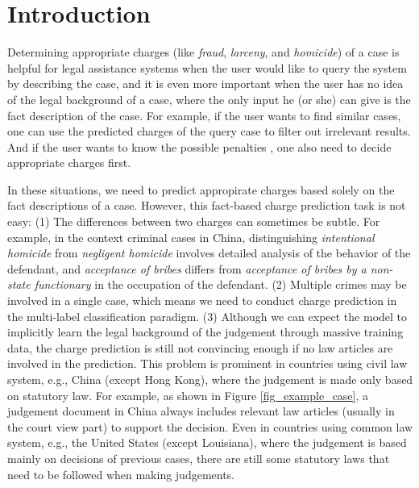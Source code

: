 \section{Introduction}
Determining appropriate charges (like \emph{fraud}, \emph{larceny}, and \emph{homicide}) of a case is helpful for legal assistance systems when the user would like to query the system by describing the case, and it is even more important when the user has no idea of the legal background of a case, where the only input he (or she) can give is the fact description of the case. 
For example, if the user wants to find similar cases, one can use the predicted charges of the query case to filter out irrelevant results. And if the user wants to know the possible penalties , one also need to decide appropriate charges first.


In these situations, we need to predict appropirate charges based solely on the fact descriptions of a case. 
However, this fact-based charge prediction task is not easy:
(1) The differences between two charges can sometimes be subtle. For example, in the context criminal cases in China, distinguishing \emph{intentional homicide} from \emph{negligent homicide} involves detailed analysis of the behavior of the defendant, and \emph{acceptance of bribes} differs from \emph{acceptance of bribes by a non-state functionary} in the occupation of the defendant. 
(2) Multiple crimes may be involved in a single case, which means we need to conduct charge prediction in the multi-label classification paradigm. 
(3)  Although we can expect the model to implicitly learn the legal background of the judgement through massive training data, the charge prediction is still not convincing enough if no law articles are involved in the prediction. This problem is prominent in countries using civil law system, e.g., China (except Hong Kong), where the judgement is made only based on statutory law. 
For example, as shown in Figure \ref{fig_example_case}, a judgement document in China always includes relevant law articles (usually in the court view part) to support the decision.  
Even in countries using common law system, e.g., the United States (except Louisiana), where the judgement is based mainly on decisions of previous cases, there are still some statutory laws that need to be followed when making judgements. 


